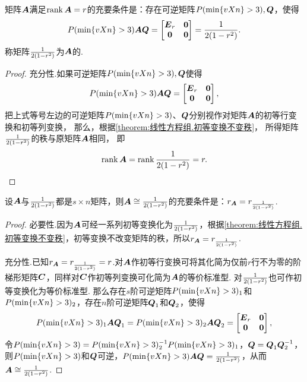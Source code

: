 \begin{theorem}
矩阵\(\A\)满足\(\rank\A=r\)的充要条件是：存在可逆矩阵\(\P,\Q\)，使得\[
\P \A \Q = \begin{bmatrix}
\E_r & \z \\ \z & \z
\end{bmatrix} = \B.
\]\rm
称矩阵\(\B\)为\(\A\)的.
\begin{proof}
充分性.如果可逆矩阵\(\P,\Q\)使得\[
\P\A\Q = \begin{bmatrix}
\E_r & \z \\ \z & \z
\end{bmatrix},
\]
把上式等号左边的可逆矩阵\(\P\)、\(\Q\)分别视作对矩阵\(\A\)的初等行变换和初等列变换，%
那么，根据\cref{theorem:线性方程组.初等变换不变秩}，%
所得矩阵\(\B\)的秩与原矩阵\(\A\)相同，%
即\[
\rank\A = \rank\B = r.
\qedhere
\]
\end{proof}
\end{theorem}

\begin{theorem}
设\(\A\)与\(\B\)都是\(s \times n\)矩阵，则\(\A \cong \B\)的充要条件是：\(r_{\A} = r_{\B}\).
\begin{proof}
必要性.因为\(\A\)可经一系列初等变换化为\(\B\)，根据\cref{theorem:线性方程组.初等变换不变秩}，初等变换不改变矩阵的秩，所以\(r_{\A} = r_{\B}\).

充分性.已知\(r_{\A} = r_{\B} = r\).对\(\A\)作初等行变换可将其化简为仅前\(r\)行不为零的阶梯形矩阵\(\C\)，同样对\(\C\)作初等列变换可化简为\(\A\)的等价标准型.
对\(\B\)也可作初等变换化为等价标准型.
那么存在\(s\)阶可逆矩阵\(\P_1\)和\(\P_2\)，存在\(n\)阶可逆矩阵\(\Q_1\)和\(\Q_2\)，使得\[
\P_1 \A \Q_1 = \P_2 \A \Q_2 = \begin{bmatrix} \E_r & \z \\ \z & \z \end{bmatrix},
\]令\(\P = \P_2^{-1} \P_1\)，\(\Q = \Q_1 \Q_2^{-1}\)，则\(\P\)和\(\Q\)可逆，\(\P \A \Q = \B\)，从而\(\A \cong \B\).
\end{proof}
\end{theorem}

